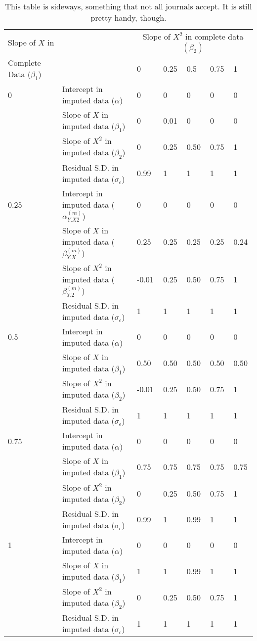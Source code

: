 \documentclass[10pt, fullpage, a4paper, titlepage]{article}
\begin{document}
\begin{sidewaystable}[ht]
\caption{This table is sideways, something that not all journals accept. It is still pretty handy, though.}
\centering
\begin{tabular}{lllllll} 
\toprule
Slope of $X$ in 	& 	&\multicolumn{5}{c}{Slope of $X^2$ in complete data $(\beta_2)$}	\\
Complete Data ($\beta_1$)&									& 0		& 0.25	& 0.5 	&0.75	&1\\ \toprule%
0		& Intercept in imputed data ($\alpha$)					& 0		& 0		&0 		&0		&0\\
		& Slope of $X$ in imputed data ($\beta_1$) 				& 0		& 0.01	&0 		&0		&0\\
		& Slope of $X^2$ in imputed data ($\beta_2$) 				& 0		& 0.25	&0.50 	&0.75	&1\\ 
		& Residual S.D. in imputed data ($\sigma_\epsilon$) 		& 0.99	& 1		&1 		&1		&1\\ 
		
0.25		& Intercept in imputed data ($\alpha_{Y.X2}^{(m)}$)			& 0		& 0		&0 		&0		&0\\
		& Slope of $X$ in imputed data ($\beta_{Y.X}^{(m)}$) 		& 0.25	& 0.25	&0.25 	&0.25	&0.24\\
		& Slope of $X^2$ in imputed data ($\beta_{Y.2}^{(m)}$) 		&-0.01	& 0.25	&0.50 	&0.75	&1\\ 
		& Residual S.D. in imputed data ($\sigma_\epsilon$) 		& 1		& 1		&1 		&1		&1\\ 
		
0.5		& Intercept in imputed data ($\alpha$)					& 0		& 0		&0 		&0		&0\\
		& Slope of $X$ in imputed data ($\beta_1$) 				& 0.50	& 0.50	&0.50 	&0.50	&0.50\\
		& Slope of $X^2$ in imputed data ($\beta_2$) 				&-0.01	& 0.25	&0.50 	&0.75	&1\\ 
		& Residual S.D. in imputed data ($\sigma_\epsilon$)		& 1		& 1		&1 		&1		&1\\ 
		
0.75		& Intercept in imputed data ($\alpha$)					& 0		& 0		&0 		&0		&0\\
		& Slope of $X$ in imputed data ($\beta_1$) 				& 0.75	& 0.75	&0.75 	&0.75	&0.75\\
		& Slope of $X^2$ in imputed data ($\beta_2$) 				& 0		& 0.25	&0.50 	&0.75	&1\\ 
		& Residual S.D. in imputed data ($\sigma_\epsilon$)		& 0.99	& 1		&0.99 	&1		&1\\ 
		
1		& Intercept in imputed data ($\alpha$)					& 0		& 0		&0 		&0		&0\\
		& Slope of $X$ in imputed data ($\beta_1$) 				& 1		& 1		&0.99 	&1		&1\\
		& Slope of $X^2$ in imputed data ($\beta_2$) 				& 0		& 0.25	&0.50 	&0.75	&1\\ 
		& Residual S.D. in imputed data ($\sigma_\epsilon$)		& 1		& 1		&1 		&1		&1\\ 
\bottomrule
\end{tabular}
\label{tab:simtabel}
\end{sidewaystable}
\end{document}
